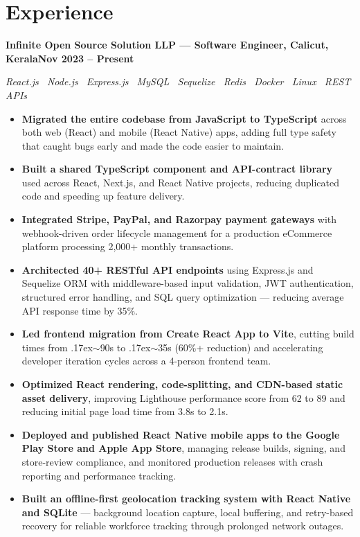 \documentclass[a4paper,10pt]{article}
\newcommand{\entry}[2]{%
  \noindent\textbf{#1}\hfill\textbf{#2}\par
}
\newcommand{\stack}[1]{%
  {\small\itshape\color{black!72}#1}\par
}
\begin{document}
\section{Experience}
\entry{Infinite Open Source Solution LLP --- Software Engineer, Calicut, Kerala}{Nov 2023 -- Present}
\stack{React.js \textbullet\ Node.js \textbullet\ Express.js \textbullet\ MySQL \textbullet\ Sequelize \textbullet\ Redis \textbullet\ Docker \textbullet\ Linux \textbullet\ REST APIs}
\begin{itemize}
  \item \textbf{Migrated the entire codebase from JavaScript to TypeScript} across both web (React) and mobile (React Native) apps, adding full type safety that caught bugs early and made the code easier to maintain.
  \item \textbf{Built a shared TypeScript component and API-contract library} used across React, Next.js, and React Native projects, reducing duplicated code and speeding up feature delivery.
  \item \textbf{Integrated Stripe, PayPal, and Razorpay payment gateways} with webhook-driven order lifecycle management for a production eCommerce platform processing 2,000+ monthly transactions.
  \item \textbf{Architected 40+ RESTful API endpoints} using Express.js and Sequelize ORM with middleware-based input validation, JWT authentication, structured error handling, and SQL query optimization --- reducing average API response time by 35\%.
  \item \textbf{Led frontend migration from Create React App to Vite}, cutting build times from {\raise.17ex\hbox{$\scriptstyle\sim$}}90s to {\raise.17ex\hbox{$\scriptstyle\sim$}}35s (60\%+ reduction) and accelerating developer iteration cycles across a 4-person frontend team.
  \item \textbf{Optimized React rendering, code-splitting, and CDN-based static asset delivery}, improving Lighthouse performance score from 62 to 89 and reducing initial page load time from 3.8s to 2.1s.
  \item \textbf{Deployed and published React Native mobile apps to the Google Play Store and Apple App Store}, managing release builds, signing, and store-review compliance, and monitored production releases with crash reporting and performance tracking.
  \item \textbf{Built an offline-first geolocation tracking system with React Native and SQLite} --- background location capture, local buffering, and retry-based recovery for reliable workforce tracking through prolonged network outages.
\end{itemize}
\end{document}
